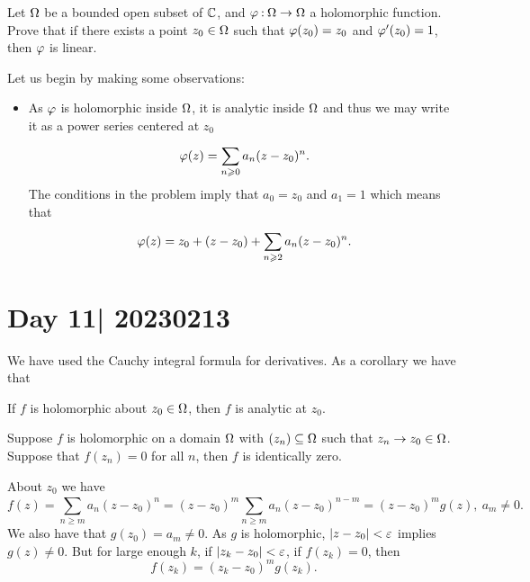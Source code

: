 \documentclass[12pt]{memoir}
\begin{document}
\begin{Ej}
    Let $\Omega$ be a bounded open subset of $\mathbb{C}$, and $\varphi\mathbin{:}\Omega\to\Omega$ a holomorphic function. Prove that if there exists a point $z_0\in\Omega$ such that $\varphi(z_0)=z_0$ and $\varphi'(z_0)=1$,
    then $\varphi$ is linear.
\end{Ej}

\begin{ptcbr}
   Let us begin by making some observations:
   \begin{itemize}
    \itemsep=-0.4em
    \item As $\varphi$ is holomorphic inside $\Omega$, it is analytic inside $\Omega$ and thus we may write it as a power series centered at $z_0$
    $$\varphi(z)=\sum_{n\geqslant 0}^{}a_n(z-z_0)^n.$$
    The conditions in the problem imply that $a_0=z_0$ and $a_1=1$ which means that 
    $$\varphi(z)=z_0+(z-z_0)+\sum_{n\geqslant 2}^{}a_n(z-z_0)^n.$$
   \end{itemize}
\end{ptcbr}

\section{Day 11| 20230213}

We have used the Cauchy integral formula for derivatives. As a corollary we have that 

\begin{Cor}
    If $f$ is holomorphic about $z_0\in\Omega$, then $f$ is analytic at $z_0$.
\end{Cor}

\begin{Th}
    Suppose $f$ is holomorphic on a domain $\Omega$ with $(z_n)\subseteq\Omega$ such that $z_n\to z_0\in\Omega$. Suppose that $f(z_n)=0$ for all $n$, then $f$ is identically zero.
\end{Th}

\begin{ptcbp}
    About $z_0$ we have 
    $$f(z)=\sum_{n\geq m}^{}a_n(z-z_0)^n=(z-z_0)^m\sum_{n\geq m}^{}a_n(z-z_0)^{n-m}=(z-z_0)^mg(z),\ a_m\neq 0.$$
    We also have that $g(z_0)=a_m\neq 0$. As $g$ is holomorphic, $|z-z_0|<\varepsilon$ implies $g(z)\neq 0$. But for large enough $k$, if $|z_k-z_0|<\varepsilon$, if $f(z_k)=0$, then 
    $$f(z_k)=(z_k-z_0)^mg(z_k).$$
\end{ptcbp}
\end{document}
